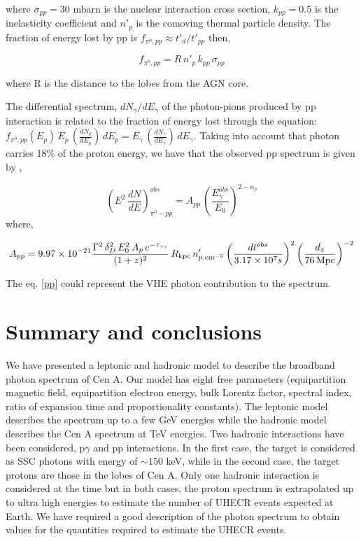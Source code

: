 \documentclass[useAMS,usenatbib,a4]{mn2e}
\def\be{\begin{equation}}
\def\ee{\end{equation}}
\begin{document}
\noindent where $\sigma_{pp}=30$ mbarn is the nuclear interaction cross section, $k_{pp}=0.5$ is the inelasticity coefficient and $n'_p$ is the comoving thermal particle density.  The fraction of energy lost by pp is  $f_{\pi^0,pp}\approx t'_d/t'_{pp}$ then,


\begin{equation}
f_{\pi^0 ,pp}=R\,n'_p\,k_{pp}\,\sigma_{pp}
\end{equation}

\noindent where R is the distance to the lobes from the AGN core.

The differential spectrum, $dN_\gamma/dE_\gamma$ of the photon-pions produced by  pp interaction  is related to the fraction of energy lost through the
equation:  $f_{\pi^0 , pp}(E_p)\,E_p\,(\frac{dN_p}{dE_p})\,dE_p=E_\gamma\,(\frac{dN_\gamma}{dE_\gamma})\,dE_\gamma$. Taking into account that  photon carries 18$\%$ of the proton energy,  we have that the observed pp spectrum is given by \citep{gup08},

\begin{equation}
\label{pp}
\left(E^{2}\, \frac{dN}{dE}\right)^{obs}_{\pi^0 - pp}= A_{pp}\, \left(\frac{E^{obs}_{\gamma}}{E_{0}}\right)^{2-\alpha_p}
\end{equation}
where,

\be
A_{pp}=9.97\times 10^{-21}  \frac{\Gamma^2\,\delta_D^2\,E_0^2\,A_p\,e^{-\tau_{\gamma\gamma}}}  {(1+z)^2}\,R_{\rm{kpc}}\,n'_{p,\rm{cm^{-3}}}\,\biggl(\frac{dt^{obs}}{3.17 \times10^7 s}\biggr)^2\,\biggl(\frac{d_z}{76\,\rm{Mpc}}\biggr)^{-2}
\ee


The eq.  \ref{pp} could represent the VHE photon contribution  to the spectrum. 


\section{Summary and conclusions}

We have presented a leptonic and hadronic model to describe the broadband photon spectrum of Cen A.  Our model has eight free parameters   (equipartition magnetic field, equipartition electron energy,  bulk Lorentz factor, spectral  index, ratio of expansion time  and proportionality constants).
The leptonic model describes the spectrum up to a few GeV energies while the hadronic model describes the Cen A spectrum at TeV energies.
Two hadronic interactions have been considered, p$\gamma$ and pp interactions. In the first case, the target is considered as SSC photons with energy of $\sim 150$ keV, while in the second case, the target protons are those in the lobes of Cen A. Only one hadronic interaction is considered at the time but in both cases, the proton spectrum is extrapolated up to ultra high energies to estimate the number of UHECR events expected at Earth. We have required a good description of the photon spectrum to obtain values for the quantities required to estimate the UHECR events. 
\end{document}
